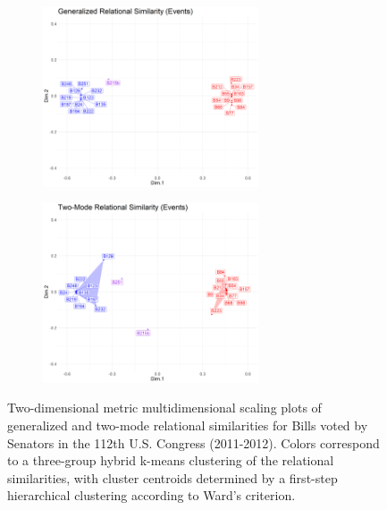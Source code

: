\documentclass[a4paper,fleqn]{cas-sc}
\begin{document}
\begin{figure}[ht!]
    \begin{subfigure}[b]{1.0\textwidth}
        \centering
        \includegraphics[width=0.7\textwidth]{Plots/grs-events-sb.png}
        \caption{}
        \label{fig:grs-events-sb}
    \end{subfigure} 
     \begin{subfigure}[b]{1.0\textwidth}
        \centering
        \includegraphics[width=0.7\textwidth]{Plots/tmrs-events-sb.png}
        \caption{}
        \label{fig:tmrs-events-sb}
    \end{subfigure} 
    \caption{Two-dimensional metric multidimensional scaling plots of generalized and two-mode relational similarities for Bills voted by Senators in the 112th U.S. Congress (2011-2012). Colors correspond to a three-group hybrid k-means clustering of the relational similarities, with cluster centroids determined by a first-step hierarchical clustering according to Ward's \citeyearpar{ward63} criterion.}
    \label{fig:events-sb}
\end{figure}
\end{document}
